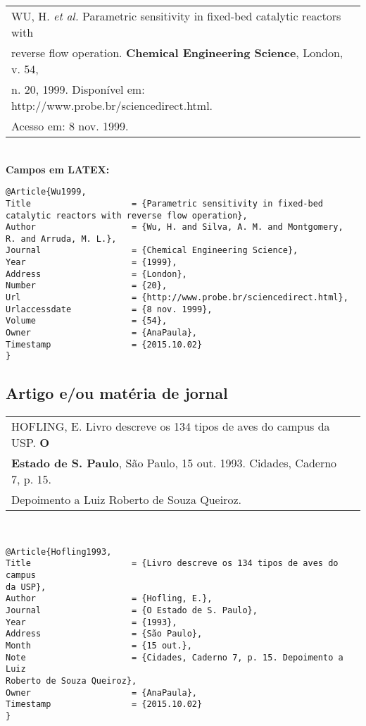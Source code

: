 \begin{tabular}{|l|c|} \hline
	WU, H. \textit{et al.} Parametric sensitivity in fixed-bed catalytic reactors with \\
	reverse flow operation. \textbf{Chemical Engineering Science}, London, v. 54,\\
	n. 20, 1999. Disponível em: http://www.probe.br/sciencedirect.html. \\Acesso em: 8 nov. 1999. \\\hline
\end{tabular} \\

\textbf{Campos em LATEX:} 

\begin{verbatim}
@Article{Wu1999,
Title                    = {Parametric sensitivity in fixed-bed 
catalytic reactors with reverse flow operation},
Author                   = {Wu, H. and Silva, A. M. and Montgomery, 
R. and Arruda, M. L.},
Journal                  = {Chemical Engineering Science},
Year                     = {1999},
Address                  = {London},
Number                   = {20},
Url                      = {http://www.probe.br/sciencedirect.html},
Urlaccessdate            = {8 nov. 1999},
Volume                   = {54},
Owner                    = {AnaPaula},
Timestamp                = {2015.10.02}
}
\end{verbatim}


\subsection{Artigo e/ou matéria de jornal}

\begin{tabular}{|l|c|} \hline
	HOFLING, E. Livro descreve os 134 tipos de aves do campus da USP. \textbf{O} \\ \textbf{Estado de S. Paulo}, São Paulo, 15 out. 1993. Cidades, Caderno 7, p. 15. \\Depoimento a Luiz Roberto de Souza Queiroz.	\\\hline
\end{tabular} \\

\begin{verbatim}
@Article{Hofling1993,
Title                    = {Livro descreve os 134 tipos de aves do campus
da USP},
Author                   = {Hofling, E.},
Journal                  = {O Estado de S. Paulo},
Year                     = {1993},
Address                  = {São Paulo},
Month                    = {15 out.},
Note                     = {Cidades, Caderno 7, p. 15. Depoimento a Luiz 
Roberto de Souza Queiroz},
Owner                    = {AnaPaula},
Timestamp                = {2015.10.02}
}
\end{verbatim}

